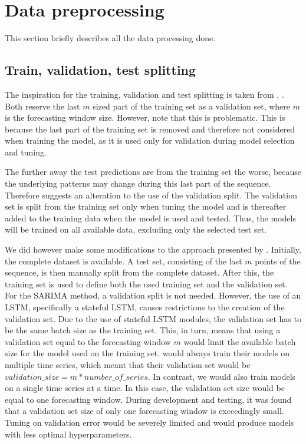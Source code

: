 \section{Data preprocessing}
\label{section:Method:Preprocessing}
This section briefly describes all the data processing done.

\subsection{Train, validation, test splitting}

The inspiration for the training, validation and test splitting is taken from
\cite{Bandara2019}, \cite{Hewamalage2021}.
Both reserve the last $m$ sized part of the training set as a validation set,
where $m$ is the forecasting window size.
However, \cite{Hewamalage2021} note that this is problematic.
This is because the last part of the training set is removed
and therefore not considered when training the model, as it is used only for validation during model selection and tuning.

The further away the test predictions are from the training set the worse,
because the underlying patterns may change during this last part of the sequence.
Therefore \cite{Hewamalage2021} suggests an alteration to the use of the validation split.
The validation set is split from the training set only when tuning the model
and is thereafter added to the training data when the model is used and tested.
Thus, the models will be trained on all available data, excluding only the selected test set.

We did however make some modifications to the approach presented by \cite{Hewamalage2021}.
Initially, the complete dataset is available.
A test set, consisting of the last $m$ points of the sequence, is then manually split from the complete dataset.
After this, the training set is used to define both the used training set and the validation set.
For the SARIMA method, a validation split is not needed.
However, the use of an LSTM, specifically a stateful LSTM, causes restrictions to the creation of the validation set.
Due to the use of stateful LSTM modules, the validation set has to be the same batch size as the training set.
This, in turn, means that using a validation set equal to the forecasting window $m$ would limit the available batch size for the model
used on the training set.
\cite{Bandara2019} would always train their models on multiple time series,
which meant that their validation set would be $validation\_size = m * number\_of\_series$.
In contrast, we would also train models on a single time series at a time.
In this case, the validation set size would be equal to one forecasting window.
During development and testing, it was found that a validation set size of only one forecasting window is exceedingly small.
Tuning on validation error would be severely limited and would produce models with less optimal hyperparameters.

